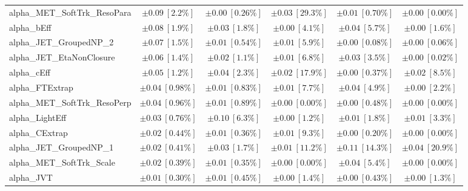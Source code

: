 \begin{sidewaystable}
\begin{center}
\begin{tabular*}{\textwidth}{@{\extracolsep{\fill}}lccccc}
alpha\_MET\_SoftTrk\_ResoPara         & $\pm 0.09\ [2.2\%] $          & $\pm 0.00\ [0.26\%] $          & $\pm 0.03\ [29.3\%] $          & $\pm 0.01\ [0.70\%] $          & $\pm 0.00\ [0.00\%] $       \\
alpha\_bEff         & $\pm 0.08\ [1.9\%] $          & $\pm 0.03\ [1.8\%] $          & $\pm 0.00\ [4.1\%] $          & $\pm 0.04\ [5.7\%] $          & $\pm 0.00\ [1.6\%] $       \\
alpha\_JET\_GroupedNP\_2         & $\pm 0.07\ [1.5\%] $          & $\pm 0.01\ [0.54\%] $          & $\pm 0.01\ [5.9\%] $          & $\pm 0.00\ [0.08\%] $          & $\pm 0.00\ [0.06\%] $       \\
alpha\_JET\_EtaNonClosure         & $\pm 0.06\ [1.4\%] $          & $\pm 0.02\ [1.1\%] $          & $\pm 0.01\ [6.8\%] $          & $\pm 0.03\ [3.5\%] $          & $\pm 0.00\ [0.02\%] $       \\
alpha\_cEff         & $\pm 0.05\ [1.2\%] $          & $\pm 0.04\ [2.3\%] $          & $\pm 0.02\ [17.9\%] $          & $\pm 0.00\ [0.37\%] $          & $\pm 0.02\ [8.5\%] $       \\
alpha\_FTExtrap         & $\pm 0.04\ [0.98\%] $          & $\pm 0.01\ [0.83\%] $          & $\pm 0.01\ [7.7\%] $          & $\pm 0.04\ [4.9\%] $          & $\pm 0.00\ [2.2\%] $       \\
alpha\_MET\_SoftTrk\_ResoPerp         & $\pm 0.04\ [0.96\%] $          & $\pm 0.01\ [0.89\%] $          & $\pm 0.00\ [0.00\%] $          & $\pm 0.00\ [0.48\%] $          & $\pm 0.00\ [0.00\%] $       \\
alpha\_LightEff         & $\pm 0.03\ [0.76\%] $          & $\pm 0.10\ [6.3\%] $          & $\pm 0.00\ [1.2\%] $          & $\pm 0.01\ [1.8\%] $          & $\pm 0.01\ [3.3\%] $       \\
alpha\_CExtrap         & $\pm 0.02\ [0.44\%] $          & $\pm 0.01\ [0.36\%] $          & $\pm 0.01\ [9.3\%] $          & $\pm 0.00\ [0.20\%] $          & $\pm 0.00\ [0.00\%] $       \\
alpha\_JET\_GroupedNP\_1         & $\pm 0.02\ [0.41\%] $          & $\pm 0.03\ [1.7\%] $          & $\pm 0.01\ [11.2\%] $          & $\pm 0.11\ [14.3\%] $          & $\pm 0.04\ [20.9\%] $       \\
alpha\_MET\_SoftTrk\_Scale         & $\pm 0.02\ [0.39\%] $          & $\pm 0.01\ [0.35\%] $          & $\pm 0.00\ [0.00\%] $          & $\pm 0.04\ [5.4\%] $          & $\pm 0.00\ [0.00\%] $       \\
alpha\_JVT         & $\pm 0.01\ [0.30\%] $          & $\pm 0.01\ [0.45\%] $          & $\pm 0.00\ [1.4\%] $          & $\pm 0.00\ [0.43\%] $          & $\pm 0.00\ [1.3\%] $       \\

\end{tabular*}
\end{center}
\end{sidewaystable}
